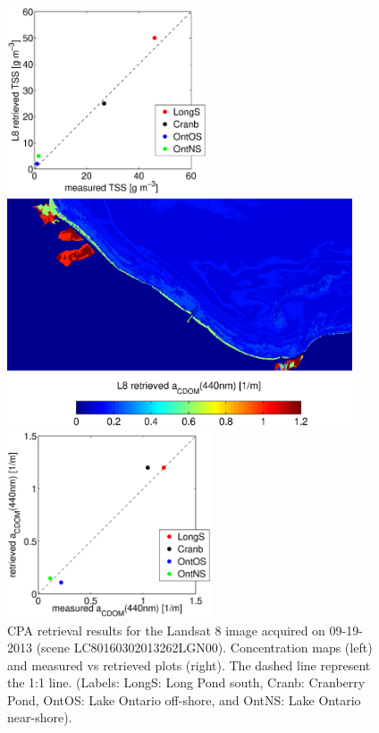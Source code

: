 \documentclass[onecolumn,3p,letterpaper]{elsarticle}
\begin{document}
\begin{figure}[htbp!]
  \hfill
  \begin{minipage}[d]{0.35\linewidth}
      \includegraphics[trim=40 0 0 0,clip,height=5.5cm]{./Images/TSSretvsmea130919_150420}
  \end{minipage}

  \begin{minipage}[c]{0.55\linewidth}
  		\centering
      \includegraphics[trim=0 0 0 30,clip,height=6.8cm]{./Images/CDOMmap130919_150420}  
  \end{minipage}
  \hfill
  \begin{minipage}[d]{0.35\linewidth}
      \includegraphics[trim=40 0 0 0,clip,height=5.5cm]{./Images/CDOMretvsmea130919_150420}
  \end{minipage}
% 
  \caption{CPA retrieval results for the Landsat 8 image acquired on 09-19-2013 (scene LC80160302013262LGN00). Concentration maps (left) and measured vs retrieved plots (right). The dashed line represent the 1:1 line. (Labels: LongS: Long Pond south, Cranb: Cranberry Pond, OntOS: Lake Ontario off-shore, and OntNS: Lake Ontario near-shore). \label{fig:CPAsMaps130919} } 
\end{figure}
\end{document}
